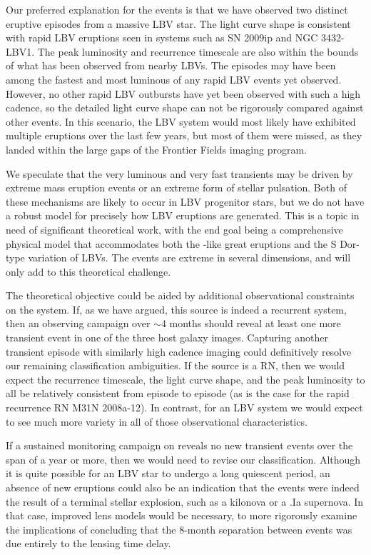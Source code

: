 Our preferred explanation for the \spock events is that we have
observed two distinct eruptive episodes from a massive LBV star.  The
light curve shape is consistent with rapid LBV eruptions seen in
systems such as SN 2009ip and NGC 3432-LBV1.  The peak luminosity and
recurrence timescale are also within the bounds of what has been
observed from nearby LBVs.  The \spock episodes may have been among
the fastest and most luminous of any rapid LBV events yet
observed. However, no other rapid LBV outbursts have yet been observed
with such a high cadence, so the detailed light curve shape can not be
rigorously compared against other events.  In this scenario, the
\spock LBV system would most likely have exhibited multiple eruptions
over the last few years, but most of them were missed, as they landed
within the large gaps of the \HST Frontier Fields imaging program.

We speculate that the very luminous and very fast \spock transients
may be driven by extreme mass eruption events or an extreme form of
stellar pulsation.  Both of these mechanisms are likely to occur in
LBV progenitor stars, but we do not have a robust model for precisely
how LBV eruptions are generated. This is a topic in need of
significant theoretical work, with the end goal being a comprehensive
physical model that accommodates both the \etacar-like great eruptions
and the S Dor-type variation of LBVs.  The \spock events are extreme
in several dimensions, and will only add to this theoretical
challenge.

The theoretical objective could be aided by additional observational
constraints on the \spock system.  If, as we have argued, this source
is indeed a recurrent system, then an observing campaign over $\sim$4
months should reveal at least one more transient event in one of the
three host galaxy images.  Capturing another transient episode with
similarly high cadence imaging could definitively resolve our
remaining classification ambiguities.  If the \spock source is a RN,
then we would expect the recurrence timescale, the light curve shape,
and the peak luminosity to all be relatively consistent from episode
to episode (as is the case for the rapid recurrence RN M31N 2008a-12).
In contrast, for an LBV system we would expect to see much more
variety in all of those observational characteristics.

If a sustained monitoring campaign on  reveals no new
transient events over the span of a year or more, then we would need
to revise our classification.  Although it is quite possible for an
LBV star to undergo a long quiescent period, an absence of new
eruptions could also be an indication that the \spock events were
indeed the result of a terminal stellar explosion, such as a kilonova
or a .Ia supernova. In that case, improved lens models would be
necessary, to more rigorously examine the implications of concluding
that the 8-month separation between events was due entirely to the
lensing time delay.

